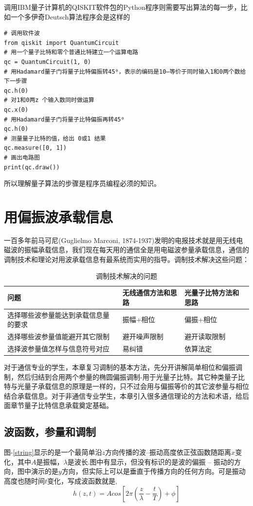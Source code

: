 \documentclass{ctexbook}
\begin{document}
调用IBM量子计算机的QISKIT软件包的Python程序则需要写出算法的每一步，比如一个多伊奇Deutsch算法程序会是这样的
\begin{lstlisting}
# 调用软件波
from qiskit import QuantumCircuit
# 用一个量子比特和零个普通比特建立一个运算电路
qc = QuantumCircuit(1, 0)
# 用Hadamard量子门将量子比特偏振转45⁰，表示的编码是10—等价于同时输入1和0两个数给下一步骤
qc.h(0)
# 对1和0两z 个输入数同时做运算
qc.x(0)
# 用Hadamard量子门将量子比特偏振再转45⁰
qc.h(0)
# 测量量子比特的值，给出 0或1 结果
qc.measure([0, 1])
# 画出电路图
print(qc.draw())
\end{lstlisting}

所以理解量子算法的步骤是程序员编程必须的知识。

\chapter{用偏振波承载信息}\label{c-modulation}
一百多年前马可尼(Guglielmo Marconi, 1874-1937)发明的电报技术就是用无线电磁波的振幅承载信息，我们现在每天用的通信全是用电磁波参量承载信息，通信的调制技术和理论对用波承载信息有最系统而实用的指导。调制技术解决这些问题：
%
\begin{table}[H]\label{t-modulation-steps}
    \caption{调制技术解决的问题}
\begin{tabular}{|l|l|l|}
\hline
问题 & 无线通信方法和思路 & 光量子比特方法和思路   \\ \hline
选择哪些波参量能达到承载信息量的要求 &  振幅+相位 &  偏振+相位 \\ \hline
选择哪些波参量值能避开其它限制 & 避开噪声限制 &  避开读取限制  \\ \hline
选择波参量值怎样与信息符号对应 & 易纠错 & 依算法定 \\
\hline
\end{tabular}
\end{table}

对于通信专业的学生，本章复习调制的基本方法，先分开讲解简单相位和偏振调制，然后归结到合用两个参量的椭圆偏振调制-用于光量子比特。其它种类量子比特与光量子承载信息的原理是一样的，只不过会用与偏振等价的其它波参量与相位结合承载信息。对于非通信专业学生，本章引入很多通信理论的方法和术语，给后面章节量子比特信息承载奠定基础。

\section{波函数，参量和调制}
图-\ref{string}显示的是一个最简单沿$z$方向传播的波--振动高度依正弦函数随距离$x$变化，其中$A$是振幅，$\lambda$是波长.图中有显示，但没有标识的是波的偏振 -- 振动的方向，图中演示的是$y$方向，但实际上可以是垂直于传播方向的任何方向。可是振动高度也随时间$t$变化，写成波函数就是,
\begin{equation}\label{e-hWave}
    h(z,t) = A cos[2\pi (\frac z \lambda - \frac t T) +\phi]
\end{equation}
\end{document}
